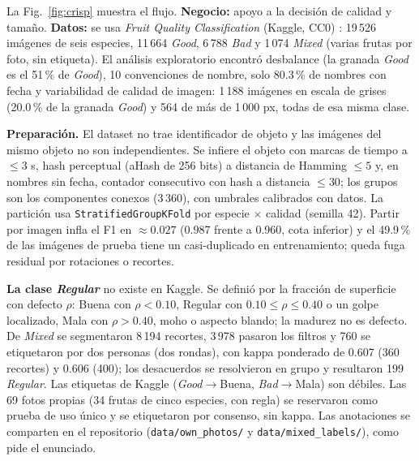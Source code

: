 \documentclass[conference]{IEEEtran}
\begin{document}
La Fig.~\ref{fig:crisp} muestra el flujo. \textbf{Negocio:} apoyo a la decisi\'on de calidad y tama\~no. \textbf{Datos:} se usa \emph{Fruit Quality Classification} (Kaggle, CC0) \cite{park_fruit_quality}: 19\,526 im\'agenes de seis especies, 11\,664 \emph{Good}, 6\,788 \emph{Bad} y 1\,074 \emph{Mixed} (varias frutas por foto, sin etiqueta). El an\'alisis exploratorio encontr\'o desbalance (la granada \emph{Good} es el 51\,\% de \emph{Good}), 10 convenciones de nombre, solo 80.3\,\% de nombres con fecha y variabilidad de calidad de imagen: 1\,188 im\'agenes en escala de grises (20.0\,\% de la granada \emph{Good}) y 564 de m\'as de 1\,000 px, todas de esa misma clase.

\textbf{Preparaci\'on.} El dataset no trae identificador de objeto y las im\'agenes del mismo objeto no son independientes. Se infiere el objeto con marcas de tiempo a $\le 3$ s, hash perceptual (aHash de 256 bits) a distancia de Hamming $\le 5$ y, en nombres sin fecha, contador consecutivo con hash a distancia $\le 30$; los grupos son los componentes conexos (3\,360), con umbrales calibrados con datos. La partici\'on usa \texttt{StratifiedGroupKFold} por especie $\times$ calidad (semilla 42). Partir por imagen infla el F1 en $\approx 0.027$ (0.987 frente a 0.960, cota inferior) y el 49.9\,\% de las im\'agenes de prueba tiene un casi-duplicado en entrenamiento; queda fuga residual por rotaciones o recortes.

\textbf{La clase \emph{Regular}} no existe en Kaggle. Se defini\'o por la fracci\'on de superficie con defecto $\rho$: Buena con $\rho<0.10$, Regular con $0.10\le\rho\le0.40$ o un golpe localizado, Mala con $\rho>0.40$, moho o aspecto blando; la madurez no es defecto. De \emph{Mixed} se segmentaron 8\,194 recortes, 3\,978 pasaron los filtros y 760 se etiquetaron por dos personas (dos rondas), con kappa ponderado de 0.607 (360 recortes) y 0.606 (400); los desacuerdos se resolvieron en grupo y resultaron 199 \emph{Regular}. Las etiquetas de Kaggle (\emph{Good}$\to$Buena, \emph{Bad}$\to$Mala) son d\'ebiles. Las 69 fotos propias (34 frutas de cinco especies, con regla) se reservaron como prueba de uso \'unico y se etiquetaron por consenso, sin kappa. Las anotaciones se comparten en el repositorio (\texttt{data/own\_photos/} y \texttt{data/mixed\_labels/}), como pide el enunciado.
\end{document}
